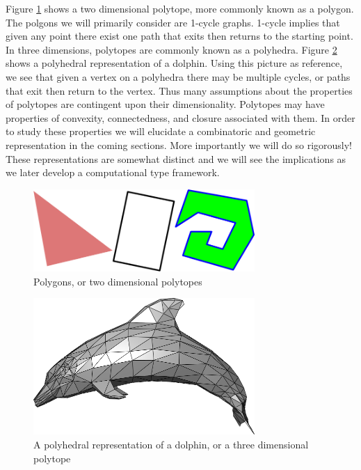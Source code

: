 Figure \ref{fig:polygons}
shows a two dimensional polytope, more commonly
known as a polygon. The polgons we will primarily consider are 1-cycle
graphs. 1-cycle implies that given any point there exist one path that exits
then returns to the starting point.
In three dimensions, polytopes are commonly known as a polyhedra.
Figure \ref{fig:polyhedra} shows a polyhedral representation of a dolphin.
Using this picture as reference, we see that given a vertex on a polyhedra
there may be
multiple cycles, or paths that exit then return to the vertex.
Thus many assumptions about the properties of polytopes are contingent upon
their dimensionality.
Polytopes may have properties of convexity,
connectedness,
and closure associated with them. In order to study these properties
we will elucidate a combinatoric and geometric representation
in the coming sections. More importantly we will do so rigorously!
These representations are somewhat distinct and we will see the
implications as we later develop a computational type framework.

\begin{figure}[h!]
  \centering
    \includegraphics[width=0.75\textwidth]{img/assorted_polygons.png}
  \caption{Polygons, or two dimensional polytopes}
  \label{fig:polygons}
\end{figure}

\begin{figure}[h!]
  \centering
    \includegraphics[width=0.75\textwidth]{img/Dolphin_triangle_mesh.png}
  \caption{A polyhedral representation of a dolphin, or a three dimensional polytope}
  \label{fig:polyhedra}
\end{figure}

